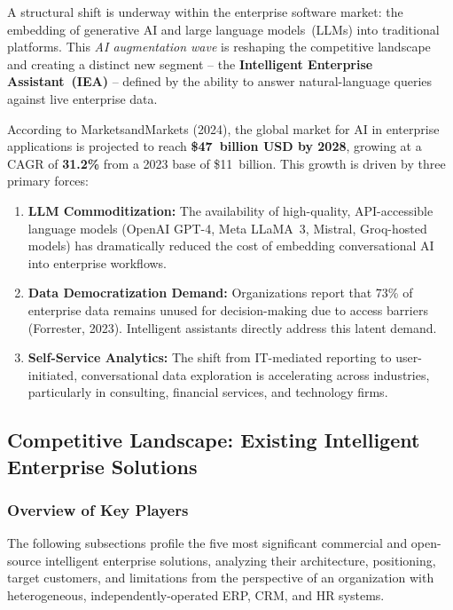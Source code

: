 \documentclass[12pt,a4paper]{report}
\begin{document}
A structural shift is underway within the enterprise software market: the embedding of generative AI
and large language models~(LLMs) into traditional platforms.
This \textit{AI augmentation wave} is reshaping the competitive landscape and creating a distinct
new segment -- the \textbf{Intelligent Enterprise Assistant~(IEA)} -- defined by the ability to
answer natural-language queries against live enterprise data.

According to MarketsandMarkets (2024), the global market for AI in enterprise applications is
projected to reach \textbf{\$47~billion USD by 2028}, growing at a CAGR of \textbf{31.2\%} from
a 2023 base of \$11~billion.
This growth is driven by three primary forces:

\begin{enumerate}
  \item \textbf{LLM Commoditization:}
    The availability of high-quality, API-accessible language models (OpenAI GPT-4,
    Meta LLaMA~3, Mistral, Groq-hosted models) has dramatically reduced the cost of embedding
    conversational AI into enterprise workflows.

  \item \textbf{Data Democratization Demand:}
    Organizations report that 73\% of enterprise data remains unused for decision-making due to
    access barriers (Forrester, 2023).
    Intelligent assistants directly address this latent demand.

  \item \textbf{Self-Service Analytics:}
    The shift from IT-mediated reporting to user-initiated, conversational data exploration is
    accelerating across industries, particularly in consulting, financial services, and technology
    firms.
\end{enumerate}

\subsection{Competitive Landscape: Existing Intelligent Enterprise Solutions}

\subsubsection{Overview of Key Players}

The following subsections profile the five most significant commercial and open-source intelligent
enterprise solutions, analyzing their architecture, positioning, target customers, and limitations
from the perspective of an organization with heterogeneous, independently-operated ERP, CRM, and HR
systems.
\end{document}
